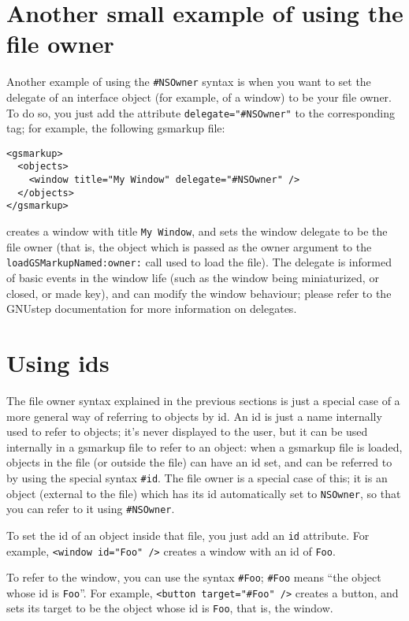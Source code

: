 \documentclass[a4paper]{article}
\begin{document}
\section{Another small example of using the file owner}
Another example of using the \texttt{\#NSOwner} syntax is when you want
to set the delegate of an interface object (for example, of a window)
to be your file owner.  To do so, you just add the attribute
\texttt{delegate="\#NSOwner"} to the corresponding tag; for example, 
the following gsmarkup file:
\begin{verbatim}
<gsmarkup>
  <objects>
    <window title="My Window" delegate="#NSOwner" />
  </objects>
</gsmarkup>
\end{verbatim}
creates a window with title \texttt{My Window}, and sets the window
delegate to be the file owner (that is, the object which is passed as
the owner argument to the \texttt{loadGSMarkupNamed:owner:} call used
to load the file).  The delegate is informed of basic events in the
window life (such as the window being miniaturized, or closed, or made
key), and can modify the window behaviour; please refer to the
GNUstep documentation for more information on delegates.

\section{Using ids}
The file owner syntax explained in the previous sections is just a
special case of a more general way of referring to objects by id.  An
id is just a name internally used to refer to objects; it's never
displayed to the user, but it can be used internally in a gsmarkup
file to refer to an object: when a gsmarkup file is loaded, objects in
the file (or outside the file) can have an id set, and can be referred
to by using the special syntax \texttt{\#id}.  The file owner is a
special case of this; it is an object (external to the file) which has
its id automatically set to \texttt{NSOwner}, so that you can refer to
it using \texttt{\#NSOwner}.

To set the id of an object inside that file, you just add an
\texttt{id} attribute.  For example, \texttt{<window id="Foo" />}
creates a window with an id of \texttt{Foo}.

To refer to the window, you can use the syntax \texttt{\#Foo};
\texttt{\#Foo} means ``the object whose id is \texttt{Foo}''.  For example,
\texttt{<button target="\#Foo" />} creates a button, and sets its target 
to be the object whose id is \texttt{Foo}, that is, the window.
\end{document}

